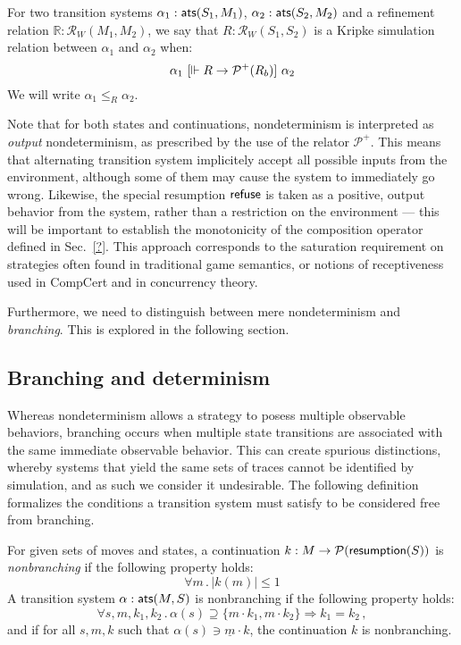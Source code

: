 \begin{definition}
For two transition systems
$\alpha_1 :  \mathsf{ats} (S_1, M_1)$,
$\alpha_2 :  \mathsf{ats} (S_2, M_2)$ and
a refinement relation
$\mathbb{R} : \mathcal{R}_W(M_1, M_2)$,
we say that
$R : \mathcal{R}_W(S_1, S_2)$
is a Kripke simulation relation between $\alpha_1$ and $\alpha_2$
when:
\[
    \alpha_1 \ [{\Vdash R \rightarrow \mathcal{P}^+(R_b)}]\  \alpha_2
\]
We will write $\alpha_1 \le_R \alpha_2$.
\end{definition}

Note that for both states and continuations,
nondeterminism is interpreted as \emph{output} nondeterminism,
as prescribed by the use of the relator $\mathcal{P}^+$.
This means that alternating transition system
implicitely accept all possible inputs from the environment,
although some of them may cause the system to immediately go wrong.
Likewise,
the special resumption $ \mathsf{refuse} $
is taken as a positive, output behavior from the system,
rather than a restriction on the environment ---
this will be important to establish the monotonicity
of the composition operator defined in Sec.~\ref{?}.
This approach corresponds to the saturation requirement on strategies
often found in traditional game semantics,
or notions of receptiveness used in CompCert
and in concurrency theory.

Furthermore, we need to distinguish between mere nondeterminism
and \emph{branching}.
This is explored in the following section.

\subsection{Branching and determinism}

Whereas nondeterminism allows a strategy to posess
multiple observable behaviors,
branching occurs when multiple state transitions
are associated with the same immediate observable behavior.
This can create spurious distinctions,
whereby systems that yield the same sets of traces
cannot be identified by simulation,
and as such we consider it undesirable.
The following definition
formalizes the conditions a transition system must satisfy
to be considered free from branching.

\begin{definition}
For given sets of moves and states,
a continuation $k : M \rightarrow \mathcal{P}( \mathsf{resumption} (S))$
is \emph{nonbranching} if the following property holds:
\[ \forall m \,.\, | k(m) | \le 1 \]
A transition system $\alpha :  \mathsf{ats} (M, S)$ is nonbranching
if the following property holds:
\[ \forall s, m, k_1, k_2 \,.\,
     \alpha(s) \supseteq \{ m \cdot k_1, m \cdot k_2 \} \Rightarrow
     k_1 = k_2 \,, \]
and if for all $s, m, k$ such that $\alpha(s) \ni \underline{m} \cdot k$,
the continuation $k$ is nonbranching.
\end{definition}

